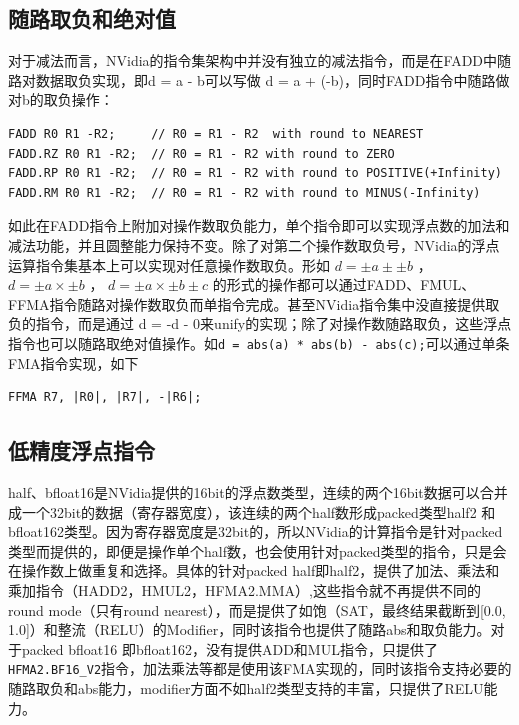 \subsection{随路取负和绝对值}

对于减法而言，NVidia的指令集架构中并没有独立的减法指令，而是在FADD中随路对数据取负实现，即d = a - b可以写做 d = a + (-b)，同时FADD指令中随路做对b的取负操作：

\begin{lstlisting}
FADD R0 R1 -R2;     // R0 = R1 - R2  with round to NEAREST
FADD.RZ R0 R1 -R2;  // R0 = R1 - R2 with round to ZERO
FADD.RP R0 R1 -R2;  // R0 = R1 - R2 with round to POSITIVE(+Infinity)
FADD.RM R0 R1 -R2;  // R0 = R1 - R2 with round to MINUS(-Infinity)
\end{lstlisting}

如此在FADD指令上附加对操作数取负能力，单个指令即可以实现浮点数的加法和减法功能，并且圆整能力保持不变。除了对第二个操作数取负号，NVidia的浮点运算指令集基本上可以实现对任意操作数取负。形如 $d = \pm a \pm \pm b$ ， $d = \pm a \times \pm b$ ， $d = \pm a \times \pm b   \pm c$ 的形式的操作都可以通过FADD、FMUL、FFMA指令随路对操作数取负而单指令完成。甚至NVidia指令集中没直接提供取负的指令，而是通过 d = -d - 0来unify的实现；除了对操作数随路取负，这些浮点指令也可以随路取绝对值操作。如\lstinline|d = abs(a) * abs(b) - abs(c);|可以通过单条FMA指令实现，如下

\begin{lstlisting}
FFMA R7, |R0|, |R7|, -|R6|;
\end{lstlisting}

\subsection{低精度浮点指令}

half、bfloat16是NVidia提供的16bit的浮点数类型，连续的两个16bit数据可以合并成一个32bit的数据（寄存器宽度），该连续的两个half数形成packed类型half2 和 bfloat162类型。因为寄存器宽度是32bit的，所以NVidia的计算指令是针对packed类型而提供的，即便是操作单个half数，也会使用针对packed类型的指令，只是会在操作数上做重复和选择。具体的针对packed half即half2，提供了加法、乘法和乘加指令（HADD2，HMUL2，HFMA2.MMA）,这些指令就不再提供不同的round mode（只有round nearest），而是提供了如饱（SAT，最终结果截断到[0.0, 1.0]）和整流（RELU）的Modifier，同时该指令也提供了随路abs和取负能力。对于packed bfloat16 即bfloat162，没有提供ADD和MUL指令，只提供了\lstinline|HFMA2.BF16_V2|指令，加法乘法等都是使用该FMA实现的，同时该指令支持必要的随路取负和abs能力，modifier方面不如half2类型支持的丰富，只提供了RELU能力。

